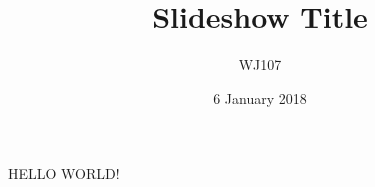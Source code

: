 \documentclass[12pt]{beamer}
\begin{document}
\title{Slideshow Title}
\author{WJ107}
\date{6 January 2018}
\maketitle

HELLO WORLD!
\end{document}
